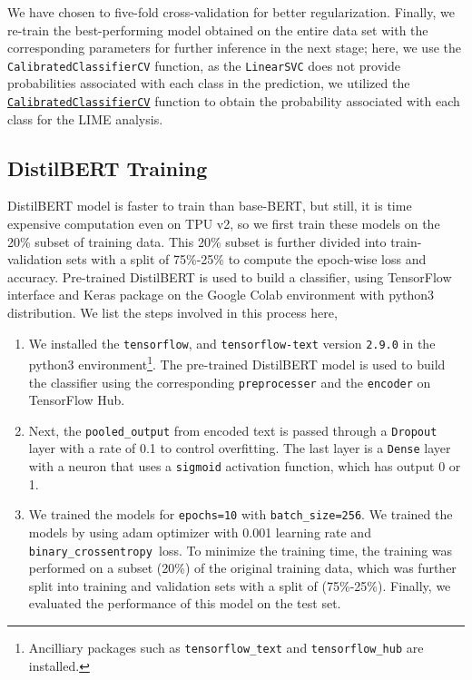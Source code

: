 \documentclass[11pt]{article}
\begin{document}
We have chosen to five-fold cross-validation for better regularization. Finally, we re-train the best-performing model obtained on the entire data set with the corresponding parameters for further inference in the next stage; here, we use the \texttt{CalibratedClassifierCV} function, as the \texttt{LinearSVC} does not provide probabilities associated with each class in the prediction, we utilized the \href{https://scikit-learn.org/stable/modules/generated/sklearn.calibration.CalibratedClassifierCV.html#sklearn.calibration.CalibratedClassifierCV}{\texttt{CalibratedClassifierCV}} function to obtain the probability associated with each class for the LIME analysis.


\subsection{DistilBERT Training} 
DistilBERT model is faster to train than base-BERT, but still, it is time expensive computation even on TPU v2, so we first train these models on the 20\% subset of training data. This 20\% subset is further divided into train-validation sets with a split of 75\%-25\% to compute the epoch-wise loss and accuracy. Pre-trained DistilBERT is used to build a classifier, using TensorFlow interface \cite{tensorflow}and Keras \cite{keras} package on the Google Colab environment with python3 distribution. We list the steps involved in this process here,
\begin{enumerate}
    \item We installed the \texttt{tensorflow}, and \texttt{tensorflow-text} version \texttt{2.9.0} in the python3 environment\footnote{Ancilliary packages such as \texttt{tensorflow\_text} and \texttt{tensorflow\_hub} are installed.}. The pre-trained DistilBERT model is used to build the classifier using the corresponding \texttt{preprocesser} and the \texttt{encoder} on TensorFlow Hub. 
    \item Next, the \texttt{pooled\_output} from encoded text is passed through a \texttt{Dropout} layer with a rate of 0.1 to control overfitting. The last layer is a \texttt{Dense} layer with a neuron that uses a \texttt{sigmoid} activation function, which has output 0 or 1.

 \item We trained the models for \texttt{epochs=10} with \texttt{batch\_size=256}. We trained the models by using adam optimizer \cite{adam} with 0.001 learning rate and \texttt{binary\_crossentropy }loss. To minimize the training time, the training was performed on a subset (20\%) of the original training data, which was further split into training and validation sets with a split of (75\%-25\%). Finally, we evaluated the performance of this model on the test set.

\end{enumerate}
\end{document}
